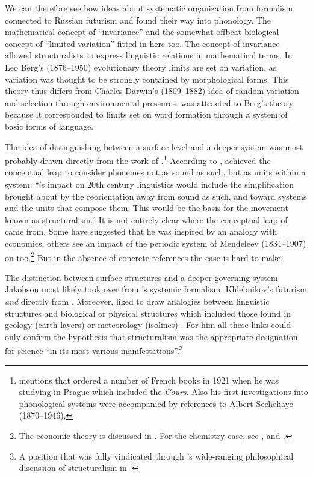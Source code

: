\documentclass[output=paper]{langscibook}
\begin{document}
We can therefore see how ideas about systematic organization from formalism connected to Russian futurism and found their way into  phonology. The mathematical concept of ``invariance'' and the somewhat offbeat biological concept of ``limited variation'' fitted in here too. The concept of invariance allowed structuralists to express linguistic relations in mathematical terms. In Leo Berg's (1876--1950) evolutionary theory limits are set on variation, as variation was thought to be strongly contained by morphological forms. This theory thus differs from Charles Darwin's (1809--1882) idea of random variation and selection through environmental pressures. {\Jakobson} was attracted to Berg's theory because it corresponded to limits set on word formation through a system of basic forms of language.

\newpage 
The idea of distinguishing between a surface level and a deeper system was most probably drawn directly from the work of {\Saussure}.\footnote{\citet[88--94]{Toman1995} mentions that {\Jakobson} ordered a number of French books in 1921 when he was studying in Prague which included the \emph{Cours}. Also his first investigations into phonological systems were accompanied by references to Albert Sechehaye (1870--1946).} According to \citet[237]{Joseph2010}, {\Saussure} achieved the conceptual leap to consider phonemes not as sound as such, but as units within a system: ``{\Saussure}'s impact on 20th century linguistics would include the simplification brought about by the reorientation away from sound as such, and toward systems and the units that compose them. This would be the basis for the movement known as structuralism.” It is not entirely clear where the conceptual leap of {\Saussure} came from. Some have suggested that he was inspired by an analogy with economics, others see an impact of the periodic system of Mendeleev (1834--1907) on {\Saussure} too.\footnote{The economic theory is discussed in \citet{Joseph2014}. For the chemistry case, see \citet{Culler1976}, \citet{Clark2008} and \citet{Silverstein2016}.} But in the absence of concrete references the case is hard to make. 


The distinction between surface structures and a deeper governing system Ja\-kob\-son most likely took over from {\Tynjanov}'s systemic formalism, Khleb\-ni\-kov's futurism \emph{and} directly from {\Saussure}. 
Moreover, {\Jakobson} liked to draw analogies between linguistic structures and biological or physical structures which included those found in geology (earth layers) or meteorology (isolines) \citep[see][74, 188--194]{Holenstein1975}. For him all these links could only confirm the hypothesis that structuralism was the appropriate designation for science ``in its most various manifestations''.\footnote{A position that was fully vindicated through {\Cassirer}'s wide-ranging philosophical discussion of structuralism in \citet{Cassirer1945}.}  
\end{document}
